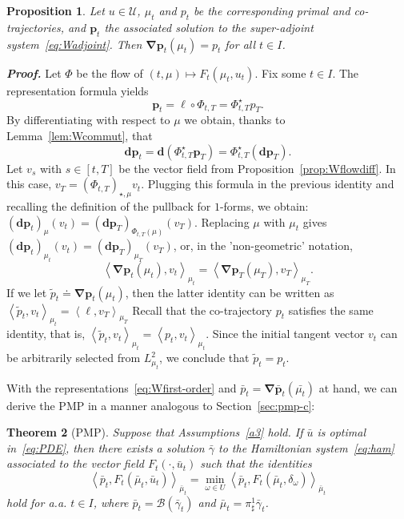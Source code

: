 \documentclass[sn-mathphys-num]{sn-jnl}
\numberwithin{equation}{section}
\theoremstyle{mythm}
\newtheorem{proposition}{Proposition}[section]
\newtheorem{theorem}[proposition]{Theorem}
\theoremstyle{mydef}
\renewenvironment{proof}{\smallskip\noindent\emph{\textbf{Proof.}}%
  \hspace{1pt}}{\hspace{-5pt}{\nobreak\quad\nobreak\hfill\nobreak%
    $\square$\vspace{2pt}\par}\smallskip\goodbreak}
\renewcommand{\mathbf}[1]{\bm{#1}}
\begin{document}
\begin{proposition}
  \label{prop:NLCfirst}
  Let \( u \in \mathcal U \), \( \mu_t \) and \( p_t \) be the corresponding primal and co-trajectories, and \( \bm p_t \) the associated solution to the super-adjoint system~\eqref{eq:Wadjoint}.
  Then \( \bm \nabla \bm p_t(\mu_t) = p_t \) for all \( t\in I \).
\end{proposition}
\begin{proof}
  Let \( \Phi \) be the flow of \( (t,\mu)\mapsto F_t(\mu_t,u_t) \).
  Fix some \( t\in I \).
  The representation formula yields
\[
  \mathbf{p}_t = \ell \circ \Phi_{t,T} = \Phi_{t,T}^\star p_T.
\]
By differentiating with respect to \( \mu \) we obtain, thanks to Lemma~\ref{lem:Wcommut}, that
\[
  \mathbf{d} \mathbf{p}_t = \mathbf{d} \left(\Phi_{t,T}^\star \mathbf{p}_T\right) = \Phi_{t,T}^\star (\mathbf{d}\mathbf{p}_T).
\]
Let \( v_s \) with \( s\in [t,T] \) be the vector field from Proposition~\ref{prop:Wflowdiff}.
In this case, \( v_T = (\Phi_{t,T})_{\star,\mu}v_t \).
Plugging this formula in the previous identity and recalling the definition of the pullback for \( 1 \)-forms, we obtain:
\(
  (\mathbf{d} \mathbf{p}_t)_{\mu}(v_t) = (\mathbf{d}\mathbf{p}_{T})_{\Phi_{t,T}(\mu)}(v_T).
\)
Replacing \( \mu \) with \( \mu_t \) gives
\(
  (\mathbf{d} \mathbf{p}_t)_{\mu_t}(v_t) = (\mathbf{d}\mathbf{p}_{T})_{\mu_{T}}(v_{T})
\),
or, in the 'non-geometric' notation,
\[
  \left\langle\bm \nabla \mathbf{p}_t(\mu_t), v_t\right\rangle_{\mu_t} = \left\langle\bm \nabla \mathbf{p}_T(\mu_T), v_T\right\rangle_{\mu_T}.
\]
If we let \( \widetilde p_t \doteq \bm\nabla \mathbf{p}_t(\mu_t) \), then the latter identity can be written as
\(
\left\langle\widetilde p_t,v_t\right\rangle_{\mu_t} = \left< \ell, v_{T} \right>_{\mu_T}
\)
Recall that the co-trajectory \( p_t \) satisfies the same identity, that is,
\(
\left\langle\widetilde p_t,v_t\right\rangle_{\mu_t} = \left\langle p_t,v_t\right\rangle_{\mu_t}
\). 
Since the initial tangent vector \( v_t \) can be arbitrarily selected from \( L^2_{\mu_t} \), we conclude that \( \widetilde p_t= p_t \).
\end{proof}

With the representations~\eqref{eq:Wfirst-order} and \( \bar{p}_t=\mathbf{\nabla}\bar{\mathbf{p}}_t(\bar{\mu_t}) \) at hand, we can derive the PMP in a manner analogous to Section~\ref{sec:pmp-c}:
\begin{theorem}[PMP]
  \label{thm:W-PMP}
  Suppose that Assumptions~\ref{a3} hold. If \( \bar{u} \) is optimal in~\eqref{eq:PDE}, then there exists a solution \( \bar{\gamma} \) to the Hamiltonian system~\eqref{eq:ham} associated to the vector field \( F_t(\cdot,\bar{u}_t) \) such that the identities
  \[
  \left<\bar{p}_t, F_t(\bar{\mu}_t,\bar{u}_t)\right>_{\bar{\mu}_t} = \min_{\omega\in U} \left<\bar{p}_t,F_t(\bar{\mu}_t,\delta_{\omega}) \right>_{\bar{\mu}_t}
  \]
  hold for a.a. \( t\in I \), where \( \bar{p}_t = \mathcal{B}(\bar{\gamma}_t) \) and \( \bar{\mu}_t=\pi^1_\sharp\bar{\gamma}_t \).
\end{theorem}
\end{document}
